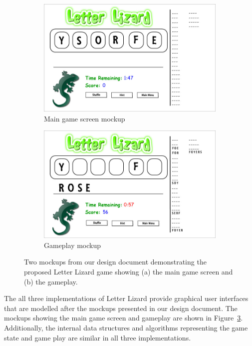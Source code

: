 \begin{figure}
    \centering
    \begin{subfigure}{0.49\textwidth}
        \includegraphics[width=\textwidth]{../mockups/Game_Screen.jpg}
        \caption{Main game screen mockup}
        \label{mainscreenmockup}
    \end{subfigure}
    \begin{subfigure}{0.49\textwidth}
        \includegraphics[width=\textwidth]{../mockups/Gameplay.jpg}
        \caption{Gameplay mockup}
        \label{gameplaymockup}
    \end{subfigure}
    \caption[Two mockups from our design document demonstrating the proposed Letter Lizard game]
    {Two mockups from our design document demonstrating the proposed Letter Lizard game
    showing (a) the main game screen and (b) the gameplay.}
    \label{mockups}
\end{figure}

The all three implementations of Letter Lizard provide graphical user interfaces
that are modelled after the mockups presented in our design document. The mockups showing the
main game screen and gameplay are shown in Figure~\ref{mockups}. Additionally, the internal 
data structures and algorithms representing the game state and game play are similar 
in all three implementations.

